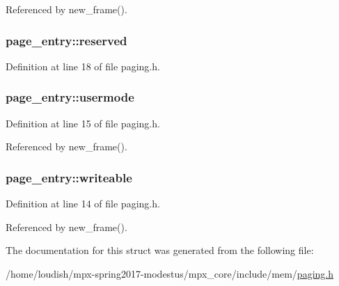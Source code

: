 Referenced by new\+\_\+frame().

\subsubsection[{\texorpdfstring{reserved}{reserved}}]{ page\+\_\+entry\+::reserved}\hypertarget{structpage__entry_af6d963f09b01571b107e6f505050c0e5}{}\label{structpage__entry_af6d963f09b01571b107e6f505050c0e5}


Definition at line 18 of file paging.\+h.

\subsubsection[{\texorpdfstring{usermode}{usermode}}]{ page\+\_\+entry\+::usermode}\hypertarget{structpage__entry_a2beafd3900a1f36f09af9c35a9a14f18}{}\label{structpage__entry_a2beafd3900a1f36f09af9c35a9a14f18}


Definition at line 15 of file paging.\+h.



Referenced by new\+\_\+frame().

\subsubsection[{\texorpdfstring{writeable}{writeable}}]{ page\+\_\+entry\+::writeable}\hypertarget{structpage__entry_a2ea8d7684fe45772b6acba70d46e41d9}{}\label{structpage__entry_a2ea8d7684fe45772b6acba70d46e41d9}


Definition at line 14 of file paging.\+h.



Referenced by new\+\_\+frame().



The documentation for this struct was generated from the following file\+:\begin{DoxyCompactItemize}
\item 
/home/loudish/mpx-\/spring2017-\/modestus/mpx\+\_\+core/include/mem/\hyperlink{paging_8h}{paging.\+h}\end{DoxyCompactItemize}
